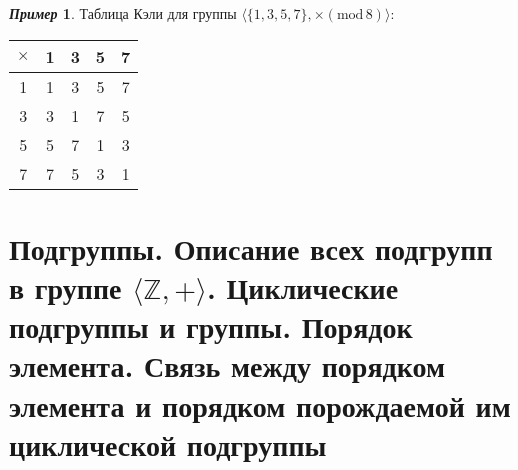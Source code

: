 \documentclass[a4paper, 14pt]{extarticle}
\newcommand{\n}{\par}
\newcommand{\integers}{\mathbb{Z}}
\renewcommand{\mod}{\mathrm{mod} \,}
\theoremstyle{definition}
\newtheorem*{exmpl*}{\textit{Пример}}
\theoremstyle{plain}
\numberwithin{theorem}{section}
\numberwithin{definition}{section}
\numberwithin{statement}{section}
\numberwithin{lemma}{section}
\numberwithin{consequence}{section}
\begin{document}
	\begin{exmpl*}
		Таблица Кэли для группы $\langle \{1, 3, 5, 7\}, \times (\mod 8) \rangle{:}$
		\begin{center}
			\begin{tabular}{c|cccc}
				$\times$ & 1 & 3 & 5 & 7\\
				\hline
				1 & 1 & 3 & 5 & 7\\
				
				3 & 3 & 1 & 7 & 5\\
				
				5 & 5 & 7 & 1 & 3\\
				
				7 & 7 & 5 & 3 & 1\\
			\end{tabular}
		\end{center} \n
	\end{exmpl*}
	\newpage
	\section{Подгруппы. Описание всех подгрупп в группе $\langle \integers, + \rangle$. Циклические подгруппы и группы. Порядок элемента. Связь между порядком элемента и порядком порождаемой им циклической подгруппы}
	
\end{document}
